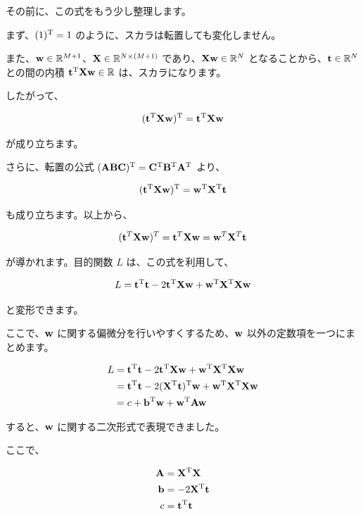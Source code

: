 その前に、この式をもう少し整理します。

まず、$(1)^{\rm T} = 1$ のように、スカラは転置しても変化しません。

また、${\bf w} \in \mathbb{R}^{M+1}$、${\bf X} \in \mathbb{R}^{N \times (M+1)}$ であり、${\bf X}{\bf w} \in \mathbb{R}^{N}$ となることから、${\bf t} \in \mathbb{R}^{N}$ との間の内積 ${\bf t}^{\rm T}{\bf X}{\bf w} \in \mathbb{R}$ は、スカラになります。

したがって、


\[
({\bf t}^{\rm T}{\bf X}{\bf w})^{\rm T} = {\bf t}^{\rm T}{\bf X}{\bf w}
\]


が成り立ちます。


さらに、転置の公式 $({\bf A}{\bf B}{\bf C})^{\rm T} = {\bf C}^{\rm T}{\bf B}^{\rm T}{\bf A}^{\rm T}$ より、


\[
({\bf t}^{\rm T}{\bf X}{\bf w})^{\rm T} = {\bf w}^{\rm T} {\bf X}^{\rm T} {\bf t}
\]


も成り立ちます。以上から、


\[
({\bf t}^{T}{\bf X}{\bf w})^{T} = {\bf t}^{T}{\bf X}{\bf w} = {\bf w}^{T} {\bf X}^{T} {\bf t}
\]


が導かれます。目的関数 $L$ は、この式を利用して、


\[
L = {\bf t}^{\rm T}{\bf t} - 2{\bf t}^{\rm T}{\bf X}{\bf w}+ {\bf w}^{\rm T}{\bf X}^{\rm T}{\bf X}{\bf w}
\]


と変形できます。


ここで、${\bf w}$ に関する偏微分を行いやすくするため、${\bf w}$ 以外の定数項を一つにまとめます。


\[
\begin{aligned}
L
&= {\bf t}^{\rm T}{\bf t}
- 2{\bf t}^{\rm T}{\bf X}{\bf w}
+ {\bf w}^{\rm T}{\bf X}^{\rm T}{\bf X}{\bf w} \\
&= {\bf t}^{\rm T}{\bf t}
- 2({\bf X}^{\rm T}{\bf t})^{\rm T} {\bf w}
+ {\bf w}^{\rm T}{\bf X}^{\rm T}{\bf X}{\bf w} \\
&= c + {\bf b}^{\rm T}{\bf w} + {\bf w}^{\rm T}{\bf A}{\bf w}
\end{aligned}
\]


すると、${\bf w}$ に関する二次形式で表現できました。

ここで、


\begin{align}
{\bf A} &= {\bf X}^{\rm T}{\bf X} \\
{\bf b} &= -2 {\bf X}^{\rm T}{\bf t} \\
c &= {\bf t}^{\rm T}{\bf t}
\end{align}


